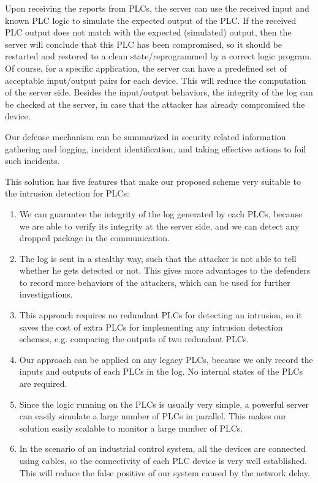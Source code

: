 Upon receiving the reports from PLCs, the server can use the received input and known PLC logic to simulate the expected output of the PLC. If the received PLC output does not match with the expected (simulated) output, then the server will conclude that this PLC has been compromised, so it should be restarted and restored to a clean state/reprogrammed by a correct logic program. Of course, for a specific application, the server can have a predefined set of acceptable input/output pairs for each device. This will reduce the computation of the server side. Besides the input/output behaviors, the integrity of the log can be checked at the server, in case that the attacker has already compromised the device.

Our defense mechanism can be summarized in security related information gathering and logging, incident identification, and taking effective actions to foil such incidents.

This solution has five features that make our proposed scheme very suitable to the intrusion detection for PLCs:

\begin{enumerate}
\item We can guarantee the integrity of the log generated by each PLCs, because we are able to verify its integrity at the server side, and we can detect any dropped package in the communication.  

\item The log is sent in a stealthy way, such that the attacker is not able to tell whether he gets detected or not. This gives more advantages to the defenders to record more behaviors of the attackers, which can be used for further investigations.  

\item This approach requires no redundant PLCs for detecting an intrusion, so it saves the cost of extra PLCs for implementing any intrusion detection schemes, e.g. comparing the outputs of two redundant PLCs. 

\item Our approach can be applied on any legacy PLCs, because we only record the inputs and outputs of each PLCs in the log. No internal states of the PLCs are required. 

\item Since the logic running on the PLCs is usually very simple, a powerful server can easily simulate a large number of PLCs in parallel. This makes our solution easily scalable to monitor a large number of PLCs.

\item In the scenario of an industrial control system, all the devices are connected using cables, so the connectivity of each PLC device is very well established. This will reduce the false positive of our system caused by the network delay. 

\end{enumerate} 

